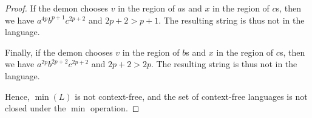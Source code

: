 \documentclass[letterpaper,11pt]{article}
\begin{document}
\begin{enumerate}
\begin{proof}
            If the demon chooses $v$ in the region of $a$s and $x$ in the
            region of $c$s, then we have $a^{4p} b^{p+1} c^{2p+2}$ and
            $2p+2 > p + 1$. The resulting string is thus not in the language.

            Finally, if the demon chooses $v$ in the region of $b$s and $x$ in
            the region of $c$s, then we have $a^{2p} b^{2p + 2} c^{2p + 2}$ and
            $2p + 2 > 2p$. The resulting string is thus not in the language.

            Hence, $\min{(L)}$ is not context-free, and the set of context-free
            languages is not closed under the $\min$ operation.
        \end{proof}

\end{enumerate}
\end{document}
